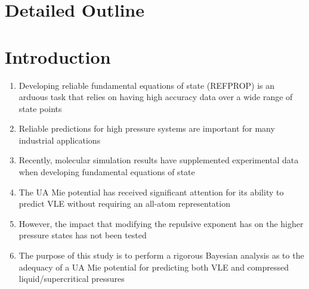 \documentclass[preprint,letterpaper,floatfix,citeautoscript,aip,jcp]{revtex4-1}
\begin{document}

\section*{Detailed Outline}

\section{Introduction}

\begin{enumerate}
	\item Developing reliable fundamental equations of state (REFPROP) is an arduous task that relies on having high accuracy data over a wide range of state points
	\item Reliable predictions for high pressure systems are important for many industrial applications
	\item Recently, molecular simulation results have supplemented experimental data when developing fundamental equations of state
	\item The UA Mie potential has received significant attention for its ability to predict VLE without requiring an all-atom representation
	\item However, the impact that modifying the repulsive exponent has on the higher pressure states has not been tested
	\item The purpose of this study is to perform a rigorous Bayesian analysis as to the adequacy of a UA Mie potential for predicting both VLE and compressed liquid/supercritical pressures
\end{enumerate}
\end{document}
